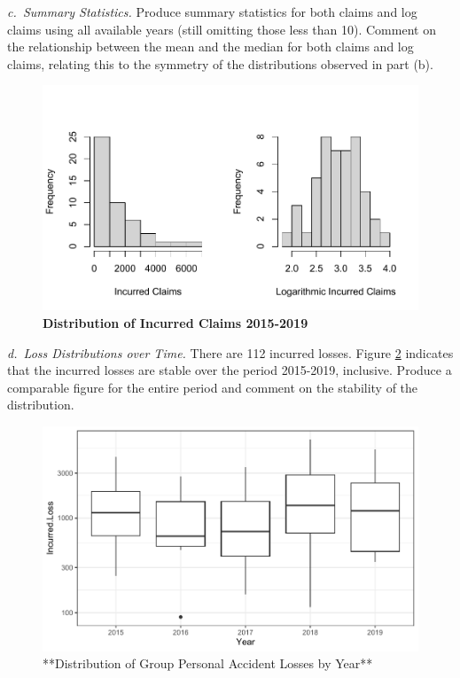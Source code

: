 \documentclass[
]{book}
\begin{document}
\emph{c.~Summary Statistics.} Produce summary statistics for both claims and log claims using all available years (still omitting those less than 10). Comment on the relationship between the mean and the median for both claims and log claims, relating this to the symmetry of the distributions observed in part (b).



\begin{figure}

{\centering \includegraphics[width=0.8\linewidth]{LossDataAnalytics_files/figure-latex/GPAClaim1-1} 

}

\caption{\textbf{Distribution of Incurred Claims 2015-2019}}\label{fig:GPAClaim1}
\end{figure}

\emph{d.~Loss Distributions over Time.} There are 112 incurred losses. Figure \ref{fig:GPALossTime} indicates that the incurred losses are stable over the period 2015-2019, inclusive. Produce a comparable figure for the entire period and comment on the stability of the distribution.

\begin{figure}

{\centering \includegraphics[width=0.7\linewidth]{LossDataAnalytics_files/figure-latex/GPALossTime-1} 

}

\caption{**Distribution of Group Personal Accident Losses by Year**}\label{fig:GPALossTime}
\end{figure}
\end{document}
